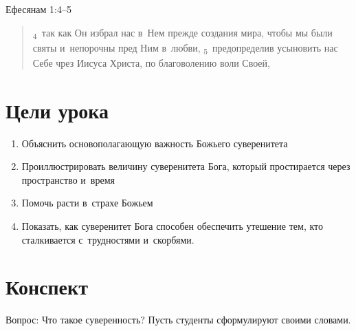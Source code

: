 \documentclass[a4paper,12pt]{article}
\begin{document}
\noindent
Ефесянам 1:4–5

\begin{quote}
\textsubscript{4}~так как Он избрал нас в~Нем прежде создания мира, чтобы мы были святы и~непорочны пред Ним в~любви,
\textsubscript{5}~предопределив усыновить нас Себе чрез Иисуса Христа, по благоволению воли Своей,
\end{quote}

\section*{Цели урока}
\begin{enumerate}
    \item Объяснить основополагающую важность Божьего суверенитета
    \item Проиллюстрировать величину суверенитета Бога, который простирается через пространство и~время
    \item Помочь расти в~страхе Божьем
    \item Показать, как суверенитет Бога способен обеспечить утешение тем, кто сталкивается с~трудностями и~скорбями. 
\end{enumerate}

\section*{Конспект}

Вопрос: Что такое суверенность? Пусть студенты сформулируют своими словами.
\end{document}
